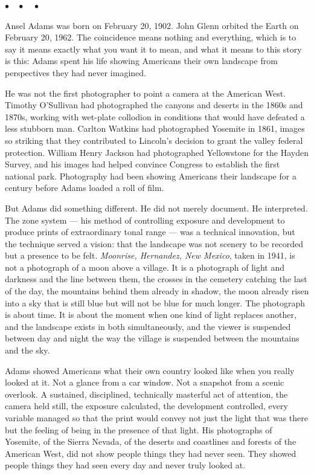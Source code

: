 \documentclass[12pt, letterpaper]{article}
\begin{document}
\begin{center}
$\bullet\quad\bullet\quad\bullet$
\end{center}

Ansel Adams was born on February 20, 1902. John Glenn orbited the Earth on February 20, 1962. The coincidence means nothing and everything, which is to say it means exactly what you want it to mean, and what it means to this story is this: Adams spent his life showing Americans their own landscape from perspectives they had never imagined.

He was not the first photographer to point a camera at the American West. Timothy O'Sullivan had photographed the canyons and deserts in the 1860s and 1870s, working with wet-plate collodion in conditions that would have defeated a less stubborn man. Carlton Watkins had photographed Yosemite in 1861, images so striking that they contributed to Lincoln's decision to grant the valley federal protection. William Henry Jackson had photographed Yellowstone for the Hayden Survey, and his images had helped convince Congress to establish the first national park. Photography had been showing Americans their landscape for a century before Adams loaded a roll of film.

But Adams did something different. He did not merely document. He interpreted. The zone system --- his method of controlling exposure and development to produce prints of extraordinary tonal range --- was a technical innovation, but the technique served a vision: that the landscape was not scenery to be recorded but a presence to be felt. \emph{Moonrise, Hernandez, New Mexico}, taken in 1941, is not a photograph of a moon above a village. It is a photograph of light and darkness and the line between them, the crosses in the cemetery catching the last of the day, the mountains behind them already in shadow, the moon already risen into a sky that is still blue but will not be blue for much longer. The photograph is about time. It is about the moment when one kind of light replaces another, and the landscape exists in both simultaneously, and the viewer is suspended between day and night the way the village is suspended between the mountains and the sky.

Adams showed Americans what their own country looked like when you really looked at it. Not a glance from a car window. Not a snapshot from a scenic overlook. A sustained, disciplined, technically masterful act of attention, the camera held still, the exposure calculated, the development controlled, every variable managed so that the print would convey not just the light that was there but the feeling of being in the presence of that light. His photographs of Yosemite, of the Sierra Nevada, of the deserts and coastlines and forests of the American West, did not show people things they had never seen. They showed people things they had seen every day and never truly looked at.
\end{document}
